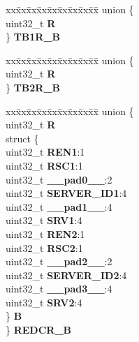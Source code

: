\begin{DoxyCompactItemize}
\begin{tabbing}
\end{tabbing}\item 
\mbox{\label{structETPU__tag_afc857d4a11e5199d467a3bb507843cd3}} 
\begin{tabbing}
xx\=xx\=xx\=xx\=xx\=xx\=xx\=xx\=xx\=\kill
union \{\\
\>uint32\_t {\bfseries R}\\
\} {\bfseries TB1R\_B}\\

\end{tabbing}\item 
\mbox{\label{structETPU__tag_aac0e6ed664c1d17ceb001477625c7085}} 
\begin{tabbing}
xx\=xx\=xx\=xx\=xx\=xx\=xx\=xx\=xx\=\kill
union \{\\
\>uint32\_t {\bfseries R}\\
\} {\bfseries TB2R\_B}\\

\end{tabbing}\item 
\mbox{\label{structETPU__tag_a12481081a75047bd264c631958c0a5c2}} 
\begin{tabbing}
xx\=xx\=xx\=xx\=xx\=xx\=xx\=xx\=xx\=\kill
union \{\\
\>uint32\_t {\bfseries R}\\
\>struct \{\\
\>\>uint32\_t {\bfseries REN1}:1\\
\>\>uint32\_t {\bfseries RSC1}:1\\
\>\>uint32\_t {\bfseries \_\_pad0\_\_}:2\\
\>\>uint32\_t {\bfseries SERVER\_ID1}:4\\
\>\>uint32\_t {\bfseries \_\_pad1\_\_}:4\\
\>\>uint32\_t {\bfseries SRV1}:4\\
\>\>uint32\_t {\bfseries REN2}:1\\
\>\>uint32\_t {\bfseries RSC2}:1\\
\>\>uint32\_t {\bfseries \_\_pad2\_\_}:2\\
\>\>uint32\_t {\bfseries SERVER\_ID2}:4\\
\>\>uint32\_t {\bfseries \_\_pad3\_\_}:4\\
\>\>uint32\_t {\bfseries SRV2}:4\\
\>\} {\bfseries B}\\
\} {\bfseries REDCR\_B}\\


\end{tabbing}
\end{DoxyCompactItemize}
